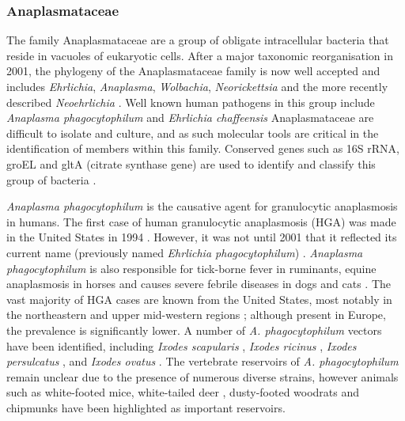 \documentclass[a4paper, nobind]{templates/ociamthesis}
\begin{document}
\hypertarget{anaplasmataceae}{%
\subsubsection{Anaplasmataceae}\label{anaplasmataceae}}

The family Anaplasmataceae are a group of obligate intracellular bacteria that reside in vacuoles of eukaryotic cells.
After a major taxonomic reorganisation in 2001, the phylogeny of the Anaplasmataceae family is now well accepted and includes \emph{Ehrlichia}, \emph{Anaplasma}, \emph{Wolbachia}, \emph{Neorickettsia} and the more recently described \emph{Neoehrlichia} \autocite{rarGeneticDiversityAnaplasma2021}.
Well known human pathogens in this group include \emph{Anaplasma phagocytophilum} and \emph{Ehrlichia chaffeensis}
Anaplasmataceae are difficult to isolate and culture, and as such molecular tools are critical in the identification of members within this family.
Conserved genes such as 16S rRNA, groEL and gltA (citrate synthase gene) are used to identify and classify this group of bacteria \autocite{kawaharaUltrastructurePhylogeneticAnalysis2004}.

\emph{Anaplasma phagocytophilum} is the causative agent for granulocytic anaplasmosis in humans. The first case of human granulocytic anaplasmosis (HGA) was made in the United States in 1994 \autocite{chenIdentificationGranulocytotropicEhrlichia1994}.
However, it was not until 2001 that it reflected its current name (previously named \emph{Ehrlichia phagocytophilum}) \autocite{dumlerReorganizationGeneraFamilies2001}.
\emph{Anaplasma phagocytophilum} is also responsible for tick-borne fever in ruminants, equine anaplasmosis in horses and causes severe febrile diseases in dogs and cats \autocite{rarAnaplasmaEhrlichiaCandidatus2011}.
The vast majority of HGA cases are known from the United States, most notably in the northeastern and upper mid-western regions \autocite{mmwrFinal2009Reports2010}; although present in Europe, the prevalence is significantly lower.
A number of \emph{A. phagocytophilum} vectors have been identified, including \emph{Ixodes scapularis} \autocite{telfordPerpetuationAgentHuman1996,hodzicAcquisitionTransmissionAgent1998}, \emph{Ixodes ricinus} \autocite{lizPCRDetectionGranulocytic2000}, \emph{Ixodes persulcatus} \autocite{eremeevaPrevalenceBacterialAgents2006}, and \emph{Ixodes ovatus} \autocite{ohashiAnaplasmaPhagocytophilumInfected2005}.
The vertebrate reservoirs of \emph{A. phagocytophilum} remain unclear due to the presence of numerous diverse strains, however animals such as white-footed mice, white-tailed deer \autocite{telfordPerpetuationAgentHuman1996,ravynIsolationEtiologicAgent2001}, dusty-footed woodrats \autocite{nicholsonDuskyFootedWoodRats1999} and chipmunks \autocite{foleyDistinctEcologicallyRelevant2009} have been highlighted as important reservoirs.
\end{document}
